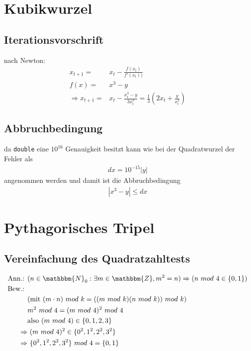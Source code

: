 \documentclass[12pt,a4paper]{article}
\begin{document}
	\section{Kubikwurzel}
		\subsection{Iterationsvorschrift}
			nach Newton: 
			\begin{align}
				x_{t+1} =& x_t - \frac{f(x_t)}{f'(x_t))}\\
				f(x) =& x^3 - y\\
				\Rightarrow x_{t+1} =& x_t - \frac{x_t^3-y}{3x_t^3} = \frac{1}{3} \left( 2x_t + \frac{y}{x_t^2} \right)
			\end{align}
		
		\subsection{Abbruchbedingung}
			da \texttt{double} eine $10^{16}$ Genauigkeit besitzt kann wie bei der Quadratwurzel der Fehler als
			\begin{align}
				dx = 10^{-15}|y|
			\end{align}
			angenommen werden und damit ist die Abbruchbedingung
			\begin{align}
				|x^3-y| \leq dx
			\end{align}
			
	\section{Pythagorisches Tripel}
		\subsection{Vereinfachung des Quadratzahltests}
			\begin{align}
				\text{Ann.: }& (n \in \mathbbm{N}_0: \exists m \in \mathbbm{Z}, m^2=n ) \Rightarrow (n\ mod\ 4 \in \{0,1\}) \\
				\text{Bew.: }& \nonumber\\
				&(\text{mit } (m\cdot n)\ mod\ k = ((m\ mod\ k)(n\ mod\ k))\ mod\ k )\\
				&m^2\ mod\ 4=(m\ mod\ 4)^2\ mod\ 4 \\
				&\text{also } (m\ mod\ 4)\in \{ 0,1,2,3 \} \\
				\Rightarrow&\ (m\ mod\ 4)^2\in \{ 0^2, 1^2, 2^2, 3^2 \}\\
				\Rightarrow&\ \{ 0^2, 1^2, 2^2, 3^2 \}\ mod\ 4 = \{0,1\}
			\end{align}
\end{document}
